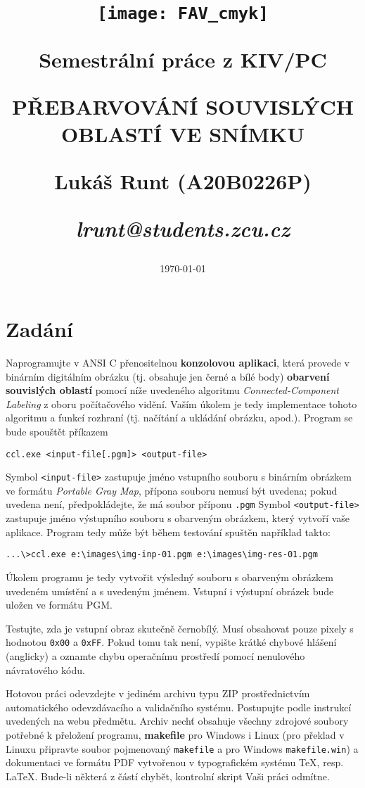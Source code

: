 \documentclass[12pt, a4paper]{article}
\title{\texttt{[image: FAV\_cmyk]}

{\huge Semestrální práce z KIV/PC}

\vspace{0.5cm}
{\LARGE PŘEBARVOVÁNÍ SOUVISLÝCH OBLASTÍ VE SNÍMKU}
\vspace{1cm} 

\Large Lukáš Runt (A20B0226P)
\vspace{0.5cm} 

\large \itshape lrunt@students.zcu.cz
}
\date{\vspace{6cm} \today}
\begin{document}
\begin{titlepage}
\clearpage\maketitle
\thispagestyle{empty}
\end{titlepage}
\tableofcontents \newpage

\section{Zadání}
Naprogramujte v ANSI C přenositelnou {\bf konzolovou aplikaci}, která provede v binárním digitálním obrázku (tj. obsahuje jen černé a bílé body) {\bf obarvení souvislých oblastí} pomocí níže uvedeného algoritmu {\it Connected-Component Labeling} z oboru počítačového vidění. Vaším úkolem je tedy implementace tohoto algoritmu a funkcí rozhraní (tj. načítání a ukládání obrázku, apod.). Program se bude spouštět příkazem

\vspace{0.5cm}
\centerline{ \texttt{ccl.exe <input-file[.pgm]> <output-file>}}
\vspace{0.5cm}

\noindent Symbol \texttt{<input-file>} zastupuje jméno vstupního souboru s binárním obrázkem ve formátu {\it Portable Gray Map}, přípona souboru nemusí být uvedena; pokud uvedena není, předpokládejte, že má soubor příponu \texttt{.pgm} Symbol \texttt{<output-file>} zastupuje jméno výstupního souboru s obarveným obrázkem, který vytvoří vaše aplikace. Program tedy může být během testování spuštěn například takto:

\vspace{0.5cm}
{ \texttt{...\textbackslash>ccl.exe e:\textbackslash images\textbackslash img-inp-01.pgm e:\textbackslash images\textbackslash img-res-01.pgm}}
\vspace{0.5cm}

Úkolem programu je tedy vytvořit výsledný souboru s obarveným obrázkem uvedeném umístění a s uvedeným jménem. Vstupní i výstupní obrázek bude uložen ve formátu PGM. 

Testujte, zda je vstupní obraz skutečně černobílý. Musí obsahovat pouze pixely s hodnotou \texttt{0x00} a \texttt{0xFF}. Pokud tomu tak není, vypište krátké chybové hlášení (anglicky) a oznamte chybu operačnímu prostředí pomocí nenulového návratového kódu.

\vspace{0.5cm}
\noindent Hotovou práci odevzdejte v jediném archivu typu ZIP prostřednictvím automatického odevzdávacího a validačního systému. Postupujte podle instrukcí uvedených na webu předmětu. Archiv nechť obsahuje všechny zdrojové soubory potřebné k přeložení programu, {\bf makefile} pro Windows i Linux (pro překlad v Linuxu připravte soubor pojmenovaný \texttt{makefile} a pro Windows \texttt{makefile.win}) a dokumentaci ve formátu PDF vytvořenou v typografickém systému \TeX, resp. \LaTeX. Bude-li některá z částí chybět, kontrolní skript Vaši práci odmítne.
\end{document}

